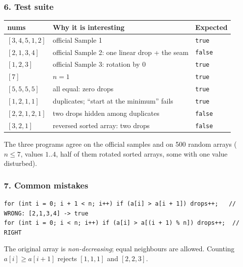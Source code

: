 \subsubsection*{6. Test suite}

\begin{testbox}
\centering\small
\begin{tabular}{@{}lll@{}}
\toprule
\textbf{nums} & \textbf{Why it is interesting} & \textbf{Expected} \\
\midrule
$[3,4,5,1,2]$ & official Sample 1 & \texttt{true} \\
$[2,1,3,4]$ & official Sample 2: one linear drop + the seam & \texttt{false} \\
$[1,2,3]$ & official Sample 3: rotation by 0 & \texttt{true} \\
$[7]$ & $n = 1$ & \texttt{true} \\
$[5,5,5,5]$ & all equal: zero drops & \texttt{true} \\
$[1,2,1,1]$ & duplicates; ``start at the minimum'' fails & \texttt{true} \\
$[2,2,1,2,1]$ & two drops hidden among duplicates & \texttt{false} \\
$[3,2,1]$ & reversed sorted array: two drops & \texttt{false} \\
\bottomrule
\end{tabular}

\medskip
The three programs agree on the official samples and on 500 random arrays ($n \le 7$, values $1..4$, half of them rotated sorted arrays, some with one value disturbed).
\end{testbox}

\subsubsection*{7. Common mistakes}

\begin{warningbox}
\begin{lstlisting}[style=snippet]
for (int i = 0; i + 1 < n; i++) if (a[i] > a[i + 1]) drops++;   // WRONG: [2,1,3,4] -> true
for (int i = 0; i < n; i++) if (a[i] > a[(i + 1) % n]) drops++;  // RIGHT
\end{lstlisting}
\end{warningbox}

\begin{warningbox}
The original array is \emph{non-decreasing}; equal neighbours are allowed. Counting $a[i] \ge a[i+1]$ rejects $[1,1,1]$ and $[2,2,3]$.
\end{warningbox}

